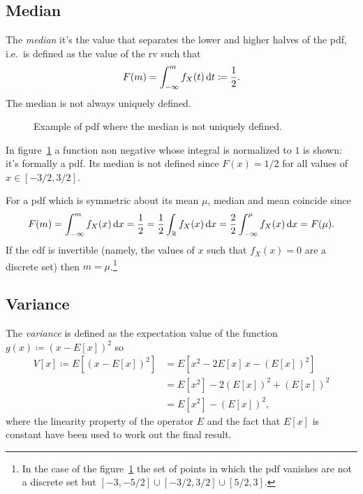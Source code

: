 \subsection{Median}

The \emph{median} it's the value that separates the lower and higher halves of the \ac{pdf}, i.e.~is defined as the value of the \ac{rv} such that
\begin{equation}
	F(m) = \int_{-\infty}^m f_X(t)\mathop{}\!\mathrm{d} t \coloneqq \frac{1}{2}.
\end{equation}
The median is not always uniquely defined.
\begin{figure}
	\centering

	\subfloat[][\ac{pdf}.]{%
	}


	\caption{Example of \ac{pdf} where the median is not uniquely defined.}
	\label{fig:exampleNotMedian}
\end{figure}
In figure~\ref{fig:exampleNotMedian} a function non negative whose integral is normalized to $1$ is shown: it's formally a \ac{pdf}.
Its median is not defined since $F(x) = 1/2$ for all values of $x\in[-3/2,3/2]$.




For a \ac{pdf} which is symmetric about its mean $\mu$, median and mean coincide since
\begin{equation}
	F(m) = \int_{-\infty}^m f_X(x)\mathop{}\!\mathrm{d} x = \frac{1}{2} = \frac{1}{2}\int_{\mathbb{R}} f_X(x)\mathop{}\!\mathrm{d} x = \frac{2}{2}\int_{-\infty}^\mu f_X(x)\mathop{}\!\mathrm{d} x = F(\mu).
\end{equation}
If the \ac{cdf} is invertible (namely, the values of $x$ such that $f_X(x) = 0$ are a discrete set) then $m=\mu$.\footnote{In the case of the figure~\ref{fig:exampleNotMedian} the set of points in which the \ac{pdf} vanishes are not a discrete set but $[-3,-5/2]\cup[-3/2,3/2]\cup[5/2,3]$.}


\subsection{Variance}

The \emph{variance} is defined as the expectation value of the function $g(x) \coloneqq (x-E[x])^2$ so
\begin{equation}
	\begin{aligned}
		V[x] \coloneqq E[(x-E[x])^2] &= E[x^2 - 2E[x]\,x - (E[x])^2 ] \\
							   &= E[x^2] - 2(E[x])^2 + (E[x])^2\\
		  &= E[x^2] - (E[x])^2,
	\end{aligned}
\end{equation}
where the linearity property of the operator $E$ and the fact that $E[x]$ is constant have been used to work out the final result.


